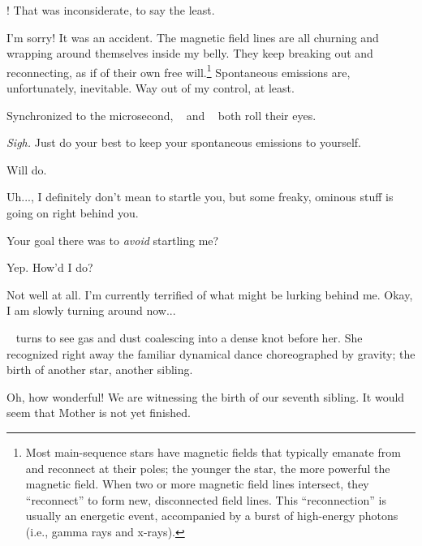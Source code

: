 \documentclass[main.tex]{subfiles}
\begin{document}
\newpara \Sterope \rmalcyone!  That was inconsiderate, to say the least.

\newpara \Alcyone I'm sorry!  It was an accident.  The magnetic field lines are all churning and wrapping around themselves inside my belly.  They keep breaking out and reconnecting, as if of their own free will.\footnote{Most main-sequence stars have magnetic fields that typically emanate from and reconnect at their poles; the younger the star, the more powerful the magnetic field.  When two or more magnetic field lines intersect, they ``reconnect'' to form new, disconnected field lines.  This ``reconnection'' is usually an energetic event, accompanied by a burst of high-energy photons (i.e., gamma rays and x-rays).}    Spontaneous emissions are, unfortunately, inevitable.  Way out of my control, at least.

\newpara \nar Synchronized to the microsecond, \rmmaia~ and \rmsterope~ both roll their eyes.

\newpara \Maia \textit{Sigh.}  Just do your best to keep your spontaneous emissions to yourself.

\newpara \Alcyone Will do.  %




\newpara \Electra Uh...\rmmaia, I definitely don't mean to startle you, but some freaky, ominous stuff is going on right behind you.

\newpara \Maia Your goal there was to \textit{avoid} startling me?

\newpara \Electra Yep.  How'd I do?

\newpara \Maia Not well at all.  I'm currently terrified of what might be lurking behind me.  Okay, I am slowly turning around now...

\newpara \nar \rmmaia~ turns to see gas and dust coalescing into a dense knot before her.  She recognized right away the familiar dynamical dance choreographed by gravity; the birth of another star, another sibling.

\newpara \Maia Oh, how wonderful!  We are witnessing the birth of our seventh sibling.  It would seem that Mother is not yet finished.
\end{document}

